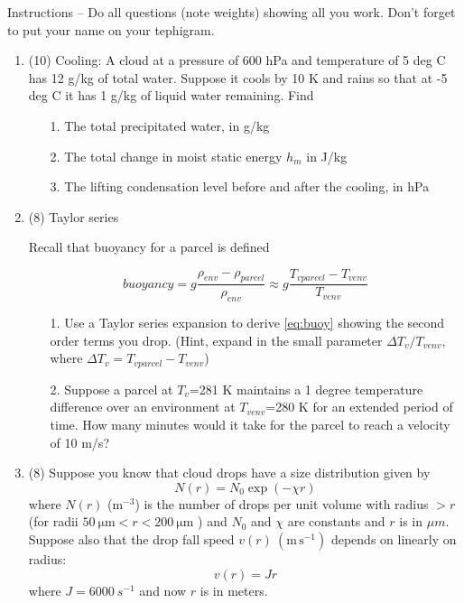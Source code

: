 \documentclass[12pt]{article}
\begin{document}
Instructions -- Do all questions (note weights) showing all you work.  Don't forget to put your name on your tephigram.

\begin{enumerate}

\item (10)   Cooling:  A cloud at a pressure of 600 hPa and temperature of 5 deg C has 12 g/kg of total water.  Suppose it cools by 10 K and rains so that at -5 deg C it has 1 g/kg of liquid water remaining.  Find

  \begin{itemize}
  \item[1.] The total precipitated water, in g/kg

  \item[2.] The total change in moist static energy $h_m$ in J/kg
  \item[3.] The lifting condensation level before and after the cooling, in hPa
    
  \end{itemize}
  
\item (8) Taylor series

  Recall that buoyancy for a parcel is defined

  \begin{equation}
    \label{eq:buoy}
  buoyancy = g \frac{\rho_{env} - \rho_{parcel}}{\rho_{env}} \approx g \frac{T_{vparcel} - T_{venv}}{T_{venv}}
\end{equation}


\begin{itemize}
\item[1.] Use a Taylor series expansion to derive \eqref{eq:buoy} showing the second order terms you drop.  (Hint, expand in the small parameter $\Delta T_v/T_{venv}$, where $\Delta T_v = T_{vparcel} - T_{venv}$)

\item[2.] Suppose a parcel at $T_v$=281 K maintains a 1 degree temperature difference over an environment at $T_{venv}$=280 K for an extended period of time.  How many minutes would it take for the parcel to reach a velocity of 10 m/s?


\end{itemize}

  
\item (8) Suppose you know that cloud drops have a size distribution given
  by 
  \begin{equation}
    \label{marshall}
    N(r)=N_0 \exp (- \chi r)
  \end{equation}
\noindent
where $N(r)$ ($\mathrm m^{-3}$) is the number of drops per unit volume with radius $>
r$ (for radii $50\ \mathrm{\mu m} < r < 200\ \mathrm{\mu m}$ ) and $N_0$
and $\chi$ are constants and $r$ is in $\mu m$.  Suppose also that the drop fall speed
$v(r)\ (\mathrm{m\,s^{-1}})$ 
depends on linearly on radius:
\begin{equation}
  \label{fallspeed}
  v(r)=Jr
\end{equation}
where $J= 6000\ s^{-1}$ and now $r$ is in meters.


\end{enumerate}
\end{document}
